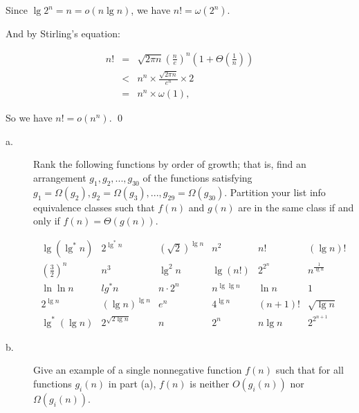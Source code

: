 Since $\lg 2^n = n = o(n\lg n)$, we have $n ! = \omega(2^n)$.

And by Stirling's equation:

\begin{eqnarray*}
n! &=& \sqrt{2\pi n}\left(\frac{n}{e}\right)^n\left(1 + \Theta\left(\frac{1}{n}\right)\right)\\
&<& n^n \times \frac{\sqrt{2\pi n}}{e^n} \times 2\\
&=& n^n \times \omega(1),
\end{eqnarray*}

So we have $n! = o(n^n)$.
\qed


\begin{description}
\item[a. \hspace{9pt}] Rank the following functions by order of growth; that is, find an arrangement $g_1, g_2, ..., g_{30}$ of the functions satisfying
$g_1 = \Omega(g_2), g_2 = \Omega(g_3), ..., g_{29} = \Omega(g_{30})$. Partition your list info equivalence classes such that $f(n)$ and $g(n)$
are in the same class if and only if $f(n) = \Theta(g(n))$.

\begin{equation*}
\begin{array}{cccccc}
\lg(\lg^*n)                 & 2^{\lg^*n}          & \left(\sqrt 2\right)^{\lg n}  & n^2           & n!        & (\lg n)!\\
\left(\frac{3}{2}\right)^n  & n^3                 & \lg^2n                        & \lg(n!)       & 2^{2^n}   & n^{\frac{1}{\lg n}}\\
\ln\ln n                    & lg^*n               & n \cdot 2^n                   & n^{\lg\lg n}  & \ln n     & 1\\
2^{\lg n}                   & (\lg n)^{\lg n}     & e^n                           & 4^{\lg n}     & (n+1)!    &  \sqrt{\lg n}\\
\lg^*(\lg n)                & 2^{\sqrt{2 \lg n}}  & n                             & 2^n           & n\lg n    & 2^{2^{n+1}}
\end{array}
\end{equation*}

\item[b. \hspace{9pt}] Give an example of a single nonnegative function $f(n)$ such that for all functions $g_i(n)$ in part (a), $f(n)$ is neither $O(g_i(n))$
nor $\Omega(g_i(n))$.
\end{description}

